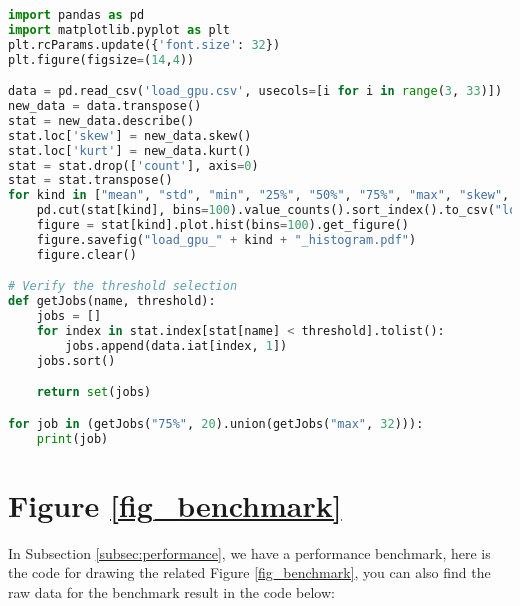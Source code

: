 \begin{lstlisting}[language=Python]
import pandas as pd
import matplotlib.pyplot as plt
plt.rcParams.update({'font.size': 32})
plt.figure(figsize=(14,4))

data = pd.read_csv('load_gpu.csv', usecols=[i for i in range(3, 33)])
new_data = data.transpose()
stat = new_data.describe()
stat.loc['skew'] = new_data.skew()
stat.loc['kurt'] = new_data.kurt()
stat = stat.drop(['count'], axis=0)
stat = stat.transpose()
for kind in ["mean", "std", "min", "25%", "50%", "75%", "max", "skew", "kurt"]:
    pd.cut(stat[kind], bins=100).value_counts().sort_index().to_csv("load_gpu_" + kind + "_histogram.csv")
    figure = stat[kind].plot.hist(bins=100).get_figure()
    figure.savefig("load_gpu_" + kind + "_histogram.pdf")
    figure.clear()

# Verify the threshold selection
def getJobs(name, threshold):
    jobs = []
    for index in stat.index[stat[name] < threshold].tolist():
        jobs.append(data.iat[index, 1])
    jobs.sort()

    return set(jobs)

for job in (getJobs("75%", 20).union(getJobs("max", 32))):
    print(job)
\end{lstlisting}

\section{Figure \ref{fig_benchmark}}
In Subsection \ref{subsec:performance}, we have a performance benchmark, here is the code for drawing the related Figure \ref{fig_benchmark}, you can also find the raw data for the benchmark result in the code below:

